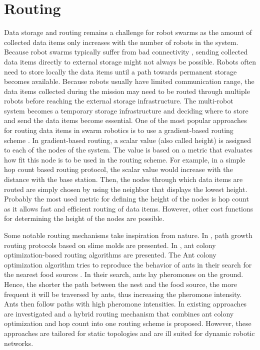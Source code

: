 \section{Routing}
Data storage and routing remains a challenge for robot swarms as the amount of collected data items only increases with the number of robots in the system. Because robot swarms typically suffer from bad connectivity \cite{amigoni2017multirobot}, sending collected data items directly to external storage might not always be possible. Robots often need to store locally the data items until a path towards permanent storage becomes available. Because robots usually have limited communication range, the data items collected during the mission may need to be routed through multiple robots before reaching the external storage infrastructure. The multi-robot system becomes a temporary storage infrastructure and deciding where to store and send the data items become essential.
One of the most popular approaches for routing data items in swarm robotics is to use a gradient-based routing scheme \cite{faruque2005analysis,draves2004comparison,watteyne2009implementation}. In gradient-based routing, a scalar value (also called height) is assigned to each of the nodes of the system. The value is based on a metric that evaluates how fit this node is to be used in the routing scheme. For example, in a simple hop count based routing protocol, the scalar value would increase with the distance with the base station. Then, the nodes through which data items are routed are simply chosen by using the neighbor that displays the lowest height. Probably the most used metric for defining the height of the nodes is hop count \cite{kuruvila2005hop,zhang2014efficient,al2019efficient} as it allows fast and efficient routing of data items. However, other cost functions for determining the height of the nodes are possible.

Some notable routing mechanisms take inspiration from nature. In \cite{li2011slime,jiang2018toward}, path growth routing protocols based on slime molds are presented. In \cite{jiang2018effective,liao2008data}, ant colony optimization-based routing algorithms are presented. The Ant colony optimization algorithm tries to reproduce the behavior of ants in their search for the nearest food sources \cite{dorigo1996ant}. In their search, ants lay pheromones on the ground. Hence, the shorter the path between the nest and the food source, the more frequent it will be traversed by ants, thus increasing the pheromone intensity. Ants then follow paths with high pheromone intensities. In \cite{liao2008data} existing approaches are investigated and a hybrid routing mechanism that combines ant colony optimization and hop count into one routing scheme is proposed. However, these approaches are tailored for static topologies and are ill suited for dynamic robotic networks.


